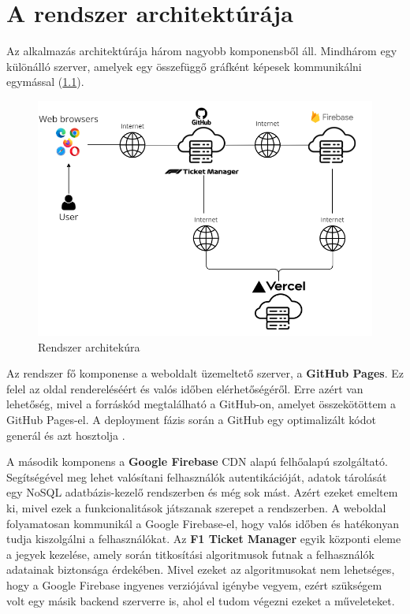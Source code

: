 \chapter{A rendszer architektúrája}

Az alkalmazás architektúrája három nagyobb komponensből áll. Mindhárom egy különálló szerver, amelyek egy összefüggő gráfként képesek kommunikálni egymással (\ref{abra:architecture}).

\begin{figure}[!h]
	\centering
	\includegraphics[scale=0.7]{images/architecture}
	\caption{Rendszer architekúra}
	\label{abra:architecture}
\end{figure}

Az rendszer fő komponense a weboldalt üzemeltető szerver, a \textbf{GitHub Pages}. Ez felel az oldal rendereléséért és valós időben elérhetőségéről. Erre azért van lehetőség, mivel a forráskód megtalálható a GitHub-on, amelyet összekötöttem a GitHub Pages-el. A deployment fázis során a GitHub egy optimalizált kódot generál és azt hosztolja \cite{Deploy}.

A második komponens a \textbf{Google Firebase} CDN alapú felhőalapú szolgáltató. Segítségével meg lehet valósítani felhasználók autentikációját, adatok tárolását egy NoSQL adatbázis-kezelő rendszerben és még sok mást. Azért ezeket emeltem ki, mivel ezek a funkcionalitások játszanak szerepet a rendszerben. A weboldal folyamatosan kommunikál a Google Firebase-el, hogy valós időben és hatékonyan tudja kiszolgálni a felhasználókat. Az \textbf{F1 Ticket Manager} egyik központi eleme a jegyek kezelése, amely során titkosítási algoritmusok futnak a felhasználók adatainak biztonsága érdekében. Mivel ezeket az algoritmusokat nem lehetséges, hogy a Google Firebase ingyenes verziójával igénybe vegyem, ezért szükségem volt egy másik backend szerverre is, ahol el tudom végezni ezeket a műveleteket.

